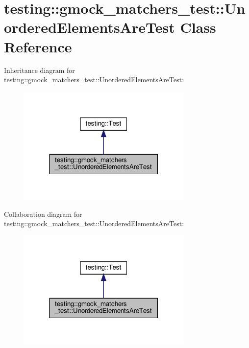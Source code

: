 \hypertarget{classtesting_1_1gmock__matchers__test_1_1_unordered_elements_are_test}{}\section{testing\+:\+:gmock\+\_\+matchers\+\_\+test\+:\+:Unordered\+Elements\+Are\+Test Class Reference}
\label{classtesting_1_1gmock__matchers__test_1_1_unordered_elements_are_test}


Inheritance diagram for testing\+:\+:gmock\+\_\+matchers\+\_\+test\+:\+:Unordered\+Elements\+Are\+Test\+:
\nopagebreak
\begin{figure}[H]
\begin{center}
\leavevmode
\includegraphics[width=245pt]{classtesting_1_1gmock__matchers__test_1_1_unordered_elements_are_test__inherit__graph}
\end{center}
\end{figure}


Collaboration diagram for testing\+:\+:gmock\+\_\+matchers\+\_\+test\+:\+:Unordered\+Elements\+Are\+Test\+:
\nopagebreak
\begin{figure}[H]
\begin{center}
\leavevmode
\includegraphics[width=245pt]{classtesting_1_1gmock__matchers__test_1_1_unordered_elements_are_test__coll__graph}
\end{center}
\end{figure}
